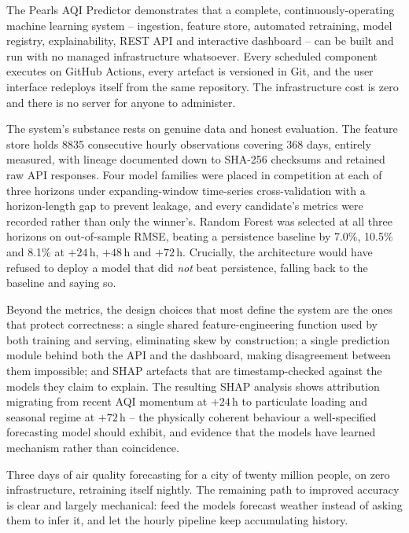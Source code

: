 \documentclass[11pt,a4paper]{article}
\begin{document}
The Pearls AQI Predictor demonstrates that a complete, continuously-operating
machine learning system -- ingestion, feature store, automated retraining,
model registry, explainability, REST API and interactive dashboard -- can be
built and run with no managed infrastructure whatsoever. Every scheduled
component executes on GitHub Actions, every artefact is versioned in Git, and
the user interface redeploys itself from the same repository. The
infrastructure cost is zero and there is no server for anyone to administer.

The system's substance rests on genuine data and honest evaluation. The feature
store holds \num{8835} consecutive hourly observations covering 368 days,
entirely measured, with lineage documented down to SHA-256 checksums and
retained raw API responses. Four model families were placed in competition at
each of three horizons under expanding-window time-series cross-validation with
a horizon-length gap to prevent leakage, and every candidate's metrics were
recorded rather than only the winner's. Random Forest was selected at all three
horizons on out-of-sample RMSE, beating a persistence baseline by 7.0\%,
10.5\% and 8.1\% at $+24$\,h, $+48$\,h and $+72$\,h. Crucially, the
architecture would have refused to deploy a model that did \emph{not} beat
persistence, falling back to the baseline and saying so.

Beyond the metrics, the design choices that most define the system are the ones
that protect correctness: a single shared feature-engineering function used by
both training and serving, eliminating skew by construction; a single
prediction module behind both the API and the dashboard, making disagreement
between them impossible; and SHAP artefacts that are timestamp-checked against
the models they claim to explain. The resulting SHAP analysis shows attribution
migrating from recent AQI momentum at $+24$\,h to particulate loading and
seasonal regime at $+72$\,h -- the physically coherent behaviour a
well-specified forecasting model should exhibit, and evidence that the models
have learned mechanism rather than coincidence.

Three days of air quality forecasting for a city of twenty million people, on
zero infrastructure, retraining itself nightly. The remaining path to improved
accuracy is clear and largely mechanical: feed the models forecast weather
instead of asking them to infer it, and let the hourly pipeline keep
accumulating history.

\end{document}
